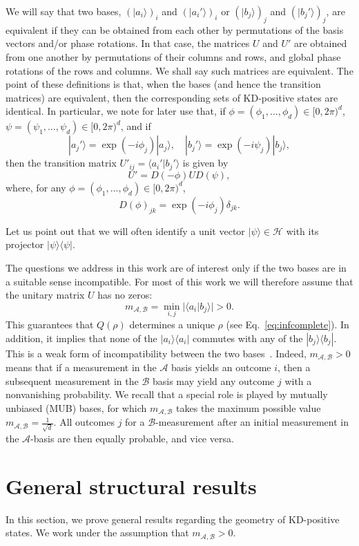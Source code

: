 \documentclass[a4paper, notitlepage, 11pt]{article}
\numberwithin{equation}{section}
\newcommand{\cket}[1]{|#1\rangle}
\newcommand{\Acal}{{\mathcal A}}
\newcommand{\Bcal}{{\mathcal B}}
\newcommand{\Hcal}{{\mathcal H}}
\newcommand{\mab}{m_{\Acal,\Bcal}}
\begin{document}
We will say that two bases, $(\cket{a_i})_i$ and $(\cket{a_i'})_i$ or $(\cket{b_j})_j$ and $(\cket{b_j'})_j$, are equivalent if they can be obtained from each other by permutations of the basis vectors and/or phase rotations. In that case, the matrices $U$ and $U'$ are obtained from one another by permutations of their columns and rows, and global  phase rotations of the rows and columns. We shall say such matrices are equivalent. The point of these definitions is that, when the bases (and hence the transition matrices) are equivalent, then the corresponding sets of KD-positive states are identical. 
In particular, we note for later use that, if $\phi=(\phi_1,\dots, \phi_d)\in [0,2\pi)^d$, $\psi=(\psi_1,\dots,\psi_d)\in[0,2\pi)^d$, and if 
$$
|a_j'\rangle=\exp(-i\phi_j)|a_j\rangle,\quad |b_j'\rangle=\exp(-i\psi_j)|b_j\rangle,
$$
then the transition matrix $U'_{ij}=\langle a_i'|b_j'\rangle$ is given by
\begin{equation}\label{eq:phases}
U'=D(-\phi)UD(\psi),
\end{equation}
where, for any $\phi=(\phi_1,\dots, \phi_d)\in [0,2\pi)^d$,
$$
D(\phi)_{jk}=\exp(-i\phi_j)\delta_{jk}.
$$


Let us point out that we will often identify a unit vector $|\psi\rangle\in\Hcal$ with its projector $|\psi\rangle\langle\psi|$.

The questions we address in this work are of interest only if the two bases are in a suitable sense incompatible. 
For most of this work we will therefore assume that the unitary matrix $U$ has no zeros:
\begin{equation}\label{eq:mab}
\mab=\min_{i,j}|\langle a_i|b_j\rangle|>0.
\end{equation}
This guarantees that $Q(\rho)$ determines a unique $\rho$ (see Eq.~\eqref{eq:infcomplete}). In addition, it implies that none of the $|a_i\rangle\langle a_i|$ commutes with any of the $|b_j\rangle\langle b_j|$.  This is a weak  form of incompatibility between the two bases~\cite{debievre2023a}. Indeed, {$\mab > 0$ means that} if a measurement in the $\Acal$ basis yields an outcome $i$, then a subsequent measurement in the $\Bcal$ basis may yield any outcome $j$ with a nonvanishing probability.  
We recall that a special role is played by mutually unbiased (MUB) bases, for which $\mab$ takes the maximum possible value $\mab=\frac{1}{\sqrt{d}}$. All outcomes $j$ for a $\Bcal$-measurement after an initial measurement in the $\Acal$-basis are then equally probable, and vice versa. 

\section{General structural results}\label{s:gen_res}
In this section, we prove general results regarding the geometry of KD-positive states. We work under the  assumption that $\mab>0$.  
\end{document}
